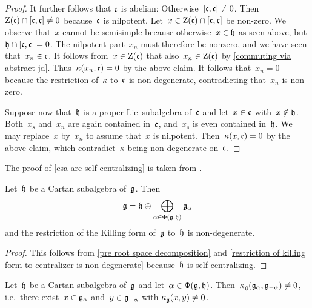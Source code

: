 \begin{proof}
  It further follows that $\mathfrak{c}$ is abelian:
  Otherwise~$[\mathfrak{c}, \mathfrak{c}] \neq 0$.
  Then $\operatorname{Z}(\mathfrak{c}) \cap [\mathfrak{c},\mathfrak{c}] \neq 0$ because~$\mathfrak{c}$ is nilpotent.
  Let~$x \in \operatorname{Z}(\mathfrak{c}) \cap [\mathfrak{c},\mathfrak{c}]$ be non-zero.
  We observe that~$x$ cannot be semisimple because otherwise~$x \in \mathfrak{h}$ as seen above, but $\mathfrak{h} \cap [\mathfrak{c},\mathfrak{c}] = 0$.
  The nilpotent part~$x_n$ must therefore be nonzero, and we have seen that~$x_n \in \mathfrak{c}$.
  It follows from~$x \in \operatorname{Z}(\mathfrak{c})$ that also~$x_n \in \operatorname{Z}(\mathfrak{c})$ by \cref{commuting via abstract jd}.
  Thus~$\kappa(x_n, \mathfrak{c}) = 0$ by the above claim.
  It follows that~$x_n = 0$ because the restriction of~$\kappa$ to~$\mathfrak{c}$ is non-degenerate, contradicting that~$x_n$ is non-zero.
 
  Suppose now that~$\mathfrak{h}$ is a proper Lie~subalgebra of~$\mathfrak{c}$ and let~$x \in \mathfrak{c}$ with~$x \notin \mathfrak{h}$.
  Both~$x_s$ and~$x_n$ are again contained in~$\mathfrak{c}$, and~$x_s$ is even contained in~$\mathfrak{h}$.
  We may replace~$x$ by~$x_n$ to assume that~$x$ is nilpotent.
  Then~$\kappa(x, \mathfrak{c}) = 0$ by the above claim, which contradict~$\kappa$ being non-degenerate on~$\mathfrak{c}$.
\end{proof}


\begin{remark}
  The proof of \cref{csa are self-centralizing} is taken from \cite[\S 8.2]{humphreys}.
\end{remark}


\begin{corollary}
  Let~$\mathfrak{h}$ be a Cartan subalgebra of~$\mathfrak{g}$.
  Then
  \[
    \mathfrak{g}
    =
    \mathfrak{h}
    \oplus
    \bigoplus_{\alpha \in \Phi(\mathfrak{g},\mathfrak{h})}
    \mathfrak{g}_\alpha
  \]
  and the restriction of the Killing form of~$\mathfrak{g}$ to~$\mathfrak{h}$ is non-degenerate.
\end{corollary}


\begin{proof}
  This follows from \cref{pre root space decomposition} and \cref{restriction of killing form to centralizer is non-degenerate} because~$\mathfrak{h}$ is self centralizing.
\end{proof}


\begin{corollary} 
  \label{g alpha and g -alpha pair non degenerate with the killing form}
  Let~$\mathfrak{h}$ be a Cartan subalgebra of~$\mathfrak{g}$ and let~$\alpha \in \Phi(\mathfrak{g},\mathfrak{h})$.
  Then~$\kappa_{\mathfrak{g}}(\mathfrak{g}_\alpha, \mathfrak{g}_{-\alpha}) \neq 0$, i.e.\ there exist~$x \in \mathfrak{g}_\alpha$ and~$y \in \mathfrak{g}_{-\alpha}$ with $\kappa_{\mathfrak{g}}(x,y) \neq 0$.
\end{corollary}


